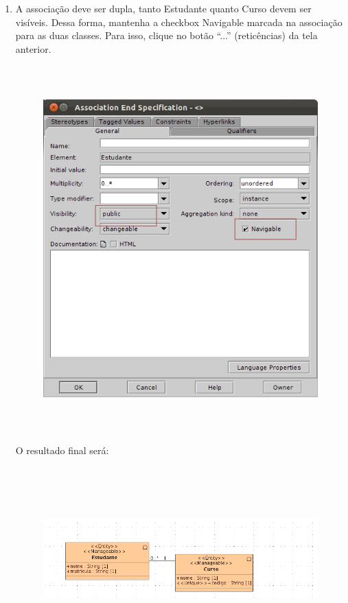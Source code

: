 \begin{enumerate}
\item A associação deve ser dupla, tanto Estudante quanto Curso devem ser
visíveis. Dessa forma, mantenha a checkbox Navigable marcada na associação para
as duas classes. Para isso, clique no botão “...” (reticências) da tela
anterior.
\begin{figure}[!htb]
	\centering
	\includegraphics[width=350pt,height=400pt]{imgs/tutorial-mdarte-0006.png}
\end{figure}
		
O resultado final será: \hfill
\begin{figure}[!htb]
	\centering
	\includegraphics[width=500pt,height=200pt]{imgs/tutorial-mdarte-0007.png}
\end{figure}
	

\end{enumerate}
